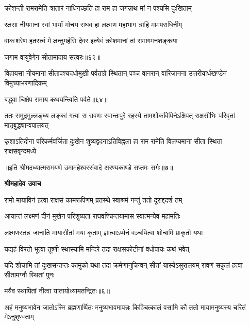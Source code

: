 \twolineshloka
{क्रोशन्ती रामरामेति त्रातारं नाधिगच्छति}
{हा राम हा जगन्नाथ मां न पश्यसि दुःखिताम्} %

\twolineshloka
{रक्षसा नीयमानां स्वां भार्यां मोचय राघव}
{हा लक्ष्मण महाभाग त्राहि मामपराधिनीम्} %

\twolineshloka
{वाकःशरेण हतस्त्वं मे क्षन्तुमर्हसि देवर}
{इत्येवं क्रोशमानां तां रामागमनशङ्कया} %

{जगाम वायुवेगेन सीतामादाय सत्वरः॥६२॥} %


\threelineshloka
{विहायसा नीयमाना सीतापश्यदधोमुखी}
{पर्वताग्रे स्थितान् पञ्च वानरान् वारिजानना}
{उत्तरीयार्धखण्डेन विमुच्याभरणादिकम्} %

{बद्ध्वा चिक्षेप रामाय कथयन्त्विति पर्वते॥६४॥} %


\threelineshloka
{ततः समुद्रमुल्लङ्घ्य लङ्कां गत्वा स रावणः}
{स्वान्तःपुरे रहस्ये तामशोकविपिनेऽक्षिपत्}
{राक्षसीभिः परिवृतां मातृबुद्ध्यान्वपालयत्} %

\fourlineindentedshloka
{कृशाऽतिदीना परिकर्मवर्जिता}
{दुःखेन शुष्यद्वदनाऽतिविह्वला}
{हा राम रामेति विलप्यमाना}
{सीता स्थिता राक्षसवृन्दमध्ये} %

{॥इति श्रीमदध्यात्मरामयणे उमामहेश्वरसंवादे
अरण्यकाण्डे सप्तमः सर्गः॥७॥
}




\textbf{श्रीमहादेव उवाच}

\twolineshloka
{रामो मायाविनं हत्वा राक्षसं कामरूपिणम्}
{प्रतस्थे स्वाश्रमं गन्तुं ततो दूराद्ददर्श तम्} %

\twolineshloka
{आयान्तं लक्ष्मणं दीनं मुखेन परिशुष्यता}
{राघवश्चिन्तयामास स्वात्मन्येव महामतिः} %

\twolineshloka
{लक्ष्मणस्तन्न जानाति मायासीतां मया कृताम्}
{ज्ञात्वाऽप्येनं वञ्चयित्वा शोचामि प्राकृतो यथा} %

\twolineshloka
{यद्यहं विरतो भूत्वा तूष्णीं स्थास्यामि मन्दिरे}
{तदा राक्षसकोटीनां वधोपायः कथं भवेत्} %

\threelineshloka
{यदि शोचामि तां दुःखसन्तप्तः कामुको यथा}
{तदा क्रमेणानुचिन्वन् सीतां यास्येऽसुरालयम्}
{रावणं सकुलं हत्वा सीतामग्नौ स्थितां पुनः} %

{मयैव स्थापितां नीत्वा यातायोध्यामतन्द्रितः॥६॥} %


\threelineshloka
{अहं मनुष्यभावेन जातोऽस्मि ब्रह्मणार्थितः}
{मनुष्यभावमापन्नः किञ्चित्कालं वसामि कौ}
{ततो मायामनुष्यस्य चरितं मेऽनुशृण्वताम्} %

